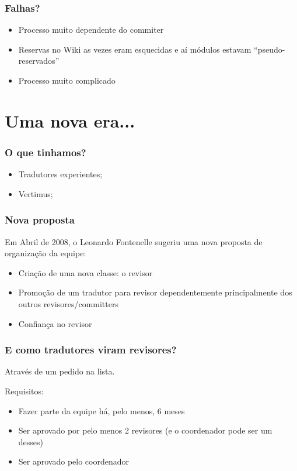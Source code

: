 \documentclass{beamer}
\begin{document}
\begin{frame}
    \frametitle{Falhas?}
    \begin{itemize}[<+->]
        \item Processo muito dependente do commiter
        \item Reservas no Wiki as vezes eram esquecidas e aí módulos estavam ``pseudo-reservados''
        \item Processo muito complicado
    \end{itemize}
\end{frame}

\section{Uma nova era...}

\begin{frame}
    \frametitle{O que tinhamos?}
    \begin{itemize}[<+->]
        \item Tradutores experientes;
        \item Vertimus;
    \end{itemize}
\end{frame}

\begin{frame}
    \frametitle{Nova proposta}  
    Em Abril de 2008, o Leonardo Fontenelle sugeriu uma nova proposta de organização da equipe:
    \begin{itemize}[<+->]
        \item Criação de uma nova classe: o revisor
        \item Promoção de um tradutor para revisor dependentemente principalmente dos outros revisores/committers
        \item Confiança no revisor
    \end{itemize}
\end{frame}


\begin{frame}
    \frametitle{E como tradutores viram revisores?}
    Através de um pedido na lista.

    Requisitos:
    \begin{itemize}[<+->]
        \item Fazer parte da equipe há, pelo menos, 6 meses
        \item Ser aprovado por pelo menos 2 revisores (e o coordenador pode ser um desses)
        \item Ser aprovado pelo coordenador
    \end{itemize}
\end{frame}
\end{document}
